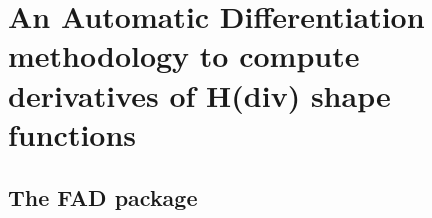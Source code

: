 \documentclass[english,11pt,3p,number,sort&compress]{elsarticle}
\begin{document}
\section{An Automatic Differentiation methodology to compute derivatives of H(div) shape functions \label{sec:Appendix-A.-Derivation}}

\lipsum[1-1]

\subsection*{The FAD package}

\lipsum[1-1]

%
 

\end{document}
